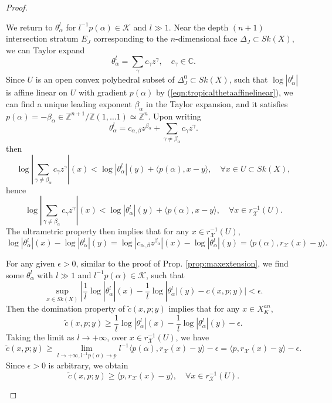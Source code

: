 \documentclass[a4paper]{article}
\theoremstyle{definition}
\newcommand{\C}{\mathbb{C}}
\newcommand{\Z}{\mathbb{Z}}
\begin{document}
\begin{proof}
\begin{enumerate}
We return to  $\theta_\alpha^l$ for $l^{-1}p(\alpha)\in \mathcal{K}$ and $l\gg 1$. Near the depth $(n+1)$ intersection stratum $E_J$ corresponding to the $n$-dimensional face $\Delta_J\subset Sk(X)$, we can  Taylor expand 
\[
\theta_\alpha^l= \sum_\gamma c_\gamma  z^\gamma,\quad c_\gamma \in \C.
\]
Since $U$ is an open convex polyhedral subset of $\Delta_J^0\subset Sk(X)$, such that $\log |\theta_\alpha^l |$ is affine linear on $U$ with gradient $p(\alpha)$ by (\ref{eqn:tropicalthetaaffinelinear}), we can 
find a unique leading exponent $\beta_\alpha$ in the Taylor expansion, and it satisfies $p(\alpha)=- \beta_\alpha \in \Z^{n+1}/\Z(1,\ldots 1)\simeq \Z^n$. Upon writing
\[
\theta_\alpha^l= c_{\alpha, \beta} z^{\beta_\alpha}+ \sum_{\gamma\neq \beta_\alpha}  c_\gamma  z^\gamma.
\]
then
\[
\log |  \sum_{\gamma\neq \beta_\alpha}  c_\gamma  z^\gamma | (x)<  \log |\theta_\alpha^l | (y) + \langle p(\alpha), x-y\rangle,  \quad \forall x\in U\subset Sk(X),
\]
hence
\[
\log |  \sum_{\gamma\neq \beta_\alpha}  c_\gamma  z^\gamma | (x)<  \log |\theta_\alpha^l | (y) + \langle p(\alpha), x-y\rangle,  \quad \forall x\in r_\mathcal{X}^{-1}(U).
\]
The ultrametric property then implies that for any $x\in r_\mathcal{X}^{-1}(U)$,
\begin{equation}
\log |\theta_\alpha^l| (x)-  \log |\theta_\alpha^l| (y) = \log |c_{\alpha,\beta} z^{\beta_\alpha} |(x)- \log |\theta_\alpha^l| (y) = \langle p(\alpha), r_\mathcal{X}(x)- y\rangle .
\end{equation}






For any given $\epsilon>0$, similar to the proof of Prop. \ref{prop:maxextension}, we find some $\theta_\alpha^l$ with $l\gg 1$ and $l^{-1}p(\alpha)\in \mathcal{K}$, such that
\[
\sup_{x\in Sk(X)}| \frac{1}{l}  \log |\theta_\alpha^l | (x)-   \frac{1}{l}  \log |\theta_\alpha^l | (y) - c(x,p;y) |< \epsilon.
\]
Then the domination property of $\tilde{c}(x,p;y)$ implies that for any $x\in X_K^{an}$,
\[
\tilde{c}(x,p;y) \geq \frac{1}{l}  \log |\theta_\alpha^l | (x)-   \frac{1}{l}  \log |\theta_\alpha^l | (y) -  \epsilon.
\]
Taking the limit as $l\to +\infty$, over $x\in r_\mathcal{X}^{-1}(U)$, we have
\[
\tilde{c}(x,p;y) \geq  \lim_{l\to +\infty, l^{-1}p(\alpha)\to p} l^{-1}\langle p(\alpha), r_\mathcal{X}(x)- y\rangle - \epsilon = \langle p , r_\mathcal{X}(x)- y\rangle - \epsilon .
\]
Since $\epsilon>0$ is arbitrary, we obtain
\begin{equation}
\tilde{c}(x,p;y) \geq  \langle p , r_\mathcal{X}(x)- y\rangle ,\quad \forall x\in r_\mathcal{X}^{-1}(U).
\end{equation}




\end{enumerate}
\end{proof}
\end{document}
